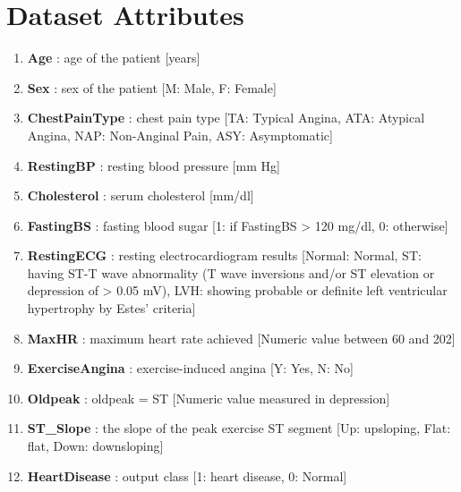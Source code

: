 \section{Dataset Attributes}
\begin{enumerate}
    \item \textbf{Age} : age of the patient [years]
    \item \textbf{Sex} : sex of the patient [M: Male, F: Female]
    \item \textbf{ChestPainType} : chest pain type [TA: Typical Angina, ATA: Atypical Angina, NAP: Non-Anginal Pain, ASY: Asymptomatic]
    \item \textbf{RestingBP} : resting blood pressure [mm Hg]
    \item \textbf{Cholesterol} : serum cholesterol [mm/dl]
    \item \textbf{FastingBS} : fasting blood sugar [1: if FastingBS > 120 mg/dl, 0: otherwise]
    \item \textbf{RestingECG} : resting electrocardiogram results [Normal: Normal, ST: having ST-T wave abnormality (T wave inversions and/or ST elevation or depression of > 0.05 mV), LVH: showing probable or definite left ventricular hypertrophy by Estes' criteria]
    \item \textbf{MaxHR} : maximum heart rate achieved [Numeric value between 60 and 202]
    \item \textbf{ExerciseAngina} : exercise-induced angina [Y: Yes, N: No]
    \item \textbf{Oldpeak} : oldpeak = ST [Numeric value measured in depression]
    \item \textbf{ST\_Slope} : the slope of the peak exercise ST segment [Up: upsloping, Flat: flat, Down: downsloping]
    \item \textbf{HeartDisease} : output class [1: heart disease, 0: Normal]
\end{enumerate}